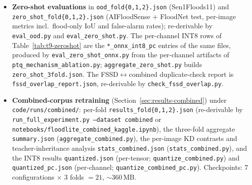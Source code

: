 \begin{itemize}
\item \textbf{Zero-shot evaluations} in \texttt{ood\_fold\{0,1,2\}.json} (Sen1Floods11) and \texttt{zero\_shot\_fold\{0,1,2\}.json} (AIFloodSense $+$ FloodNet test, per-image metrics incl.\ flood-only IoU and false-alarm rates); re-derivable by \texttt{eval\_ood.py} and \texttt{eval\_zero\_shot.py}. The per-channel INT8 rows of Table~\ref{tab:t9-zeroshot} are the \texttt{*\_onnx\_int8\_pc} entries of the same files, produced by \texttt{eval\_zero\_shot\_onnx.py} from the per-channel artifacts of \texttt{ptq\_mechanism\_ablation.py}; \texttt{aggregate\_zero\_shot.py} builds \texttt{zero\_shot\_3fold.json}. The FSSD$\leftrightarrow$combined duplicate-check report is \texttt{fssd\_overlap\_report.json}, re-derivable by \texttt{check\_fssd\_overlap.py}.
\item \textbf{Combined-corpus retraining} (Section~\ref{sec:results-combined}) under \texttt{code/runs/combined/}: per-fold \texttt{results\_fold\{0,1,2\}.json} (re-derivable by \texttt{run\_full\_experiment.py --dataset combined} or \texttt{notebooks/floodlite\_combined\_kaggle.ipynb}), the three-fold aggregate \texttt{summary.json} (\texttt{aggregate\_combined.py}), the per-image KD contrasts and teacher-inheritance analysis \texttt{stats\_combined.json} (\texttt{stats\_combined.py}), and the INT8 results \texttt{quantized.json} (per-tensor; \texttt{quantize\_combined.py}) and \texttt{quantized\_pc.json} (per-channel; \texttt{quantize\_combined\_pc.py}). Checkpoints: 7 configurations $\times$ 3 folds $= 21$, $\sim 360$\,MB.
\end{itemize}

